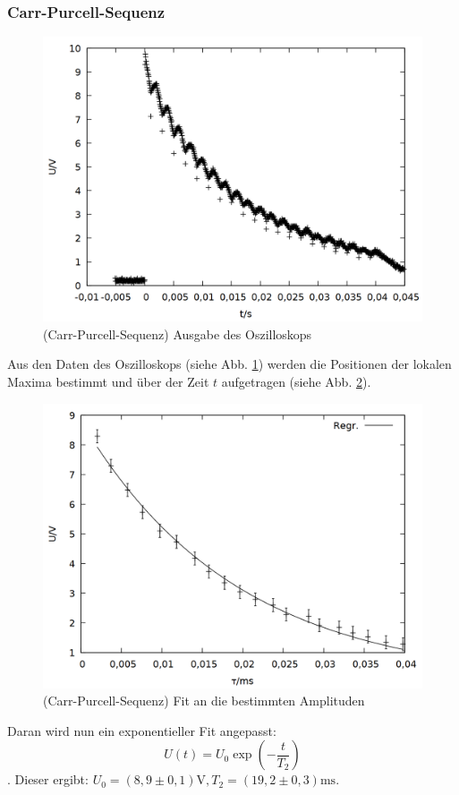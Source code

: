\subsubsection{Carr-Purcell-Sequenz}
\begin{figure}[h]
\centering
\includegraphics[width=0.75\linewidth]{data/p402_443_data/carr_purcell_sequenz/plot_156.png}
\caption{(Carr-Purcell-Sequenz) Ausgabe des Oszilloskops}
\label{fig:carr_raw}
\end{figure}

Aus den Daten des Oszilloskops (siehe Abb. \ref{fig:carr_raw}) werden die Positionen der lokalen Maxima bestimmt und über der Zeit $t$ aufgetragen (siehe Abb. \ref{fig:carr}).
\begin{figure}[h]
\centering
\includegraphics[width=0.75\linewidth]{data/p402_443_data/carr_purcell_sequenz/out_carr.png}
\caption{(Carr-Purcell-Sequenz) Fit an die bestimmten Amplituden}
\label{fig:carr}
\end{figure}

Daran wird nun ein exponentieller Fit angepasst: $$U(t) = U_0\exp{\left(-\frac{t}{T_2}\right)}$$. Dieser ergibt: $U_0 = (8,9\pm 0,1)\si{\volt}, T_2 = (19,2\pm 0,3) \si{\milli\second}$.\\

